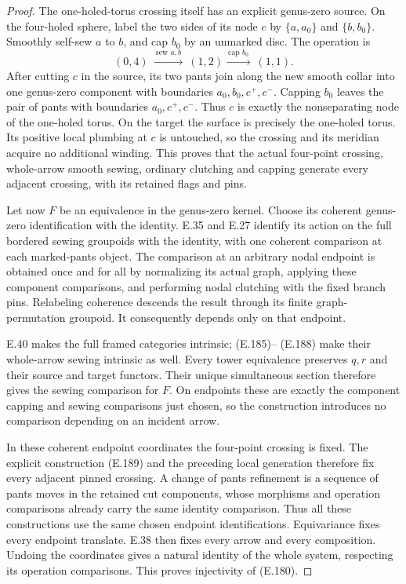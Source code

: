 \begin{proof}
The one-holed-torus crossing itself has an explicit genus-zero
source.  On the four-holed sphere, label the two sides of its
node $c$ by $\{a,a_0\}$ and $\{b,b_0\}$.  Smoothly self-sew
$a$ to $b$, and cap $b_0$ by an unmarked disc.  The operation is
\[
 (0,4)\ \xrightarrow{\ \text{sew }a,b\ }\ (1,2)
             \xrightarrow{\ \text{cap }b_0\ }\ (1,1).       \tag{E.189}
\]
After cutting $c$ in the source, its two pants join along
the new smooth collar into one genus-zero component with
boundaries $a_0,b_0,c^+,c^-$.  Capping $b_0$ leaves the
pair of pants with boundaries $a_0,c^+,c^-$.  Thus $c$
is exactly the nonseparating node of the one-holed torus.
On the target the surface is precisely the one-holed torus.
Its positive local plumbing at $c$ is untouched, so the
crossing and its meridian acquire no additional winding.
This proves that the actual four-point crossing, whole-arrow
smooth sewing, ordinary clutching and capping generate
every adjacent crossing, with its retained flags and pins.

Let now $F$ be an equivalence in the genus-zero kernel.
Choose its coherent genus-zero identification with the
identity.  E.35 and E.27 identify its action on the full
bordered sewing groupoids with the identity, with one
coherent comparison at each marked-pants object.  The
comparison at an arbitrary nodal endpoint is obtained once
and for all by normalizing its actual graph, applying these
component comparisons, and performing nodal clutching with
the fixed branch pins.  Relabeling coherence descends the
result through its finite graph-permutation groupoid.
It consequently depends only on that endpoint.

E.40 makes the full framed categories intrinsic; (E.185)--
(E.188) make their whole-arrow sewing intrinsic as well.
Every tower equivalence preserves $q,r$ and their source
and target functors.  Their unique simultaneous section
therefore gives the sewing comparison for $F$.  On endpoints
these are exactly the component capping and sewing comparisons
just chosen, so the construction introduces no comparison
depending on an incident arrow.

In these coherent endpoint coordinates the four-point
crossing is fixed.  The explicit construction (E.189) and
the preceding local generation therefore fix every adjacent
pinned crossing.  A change of pants refinement is a sequence
of pants moves in the retained cut components, whose
morphisms and operation comparisons already carry the same
identity comparison.  Thus all these constructions use the
same chosen endpoint identifications.  Equivariance fixes
every endpoint translate.  E.38 then fixes every arrow and
every composition.  Undoing the coordinates gives a natural
identity of the whole system, respecting its operation
comparisons.  This proves injectivity of (E.180).


\end{proof}
